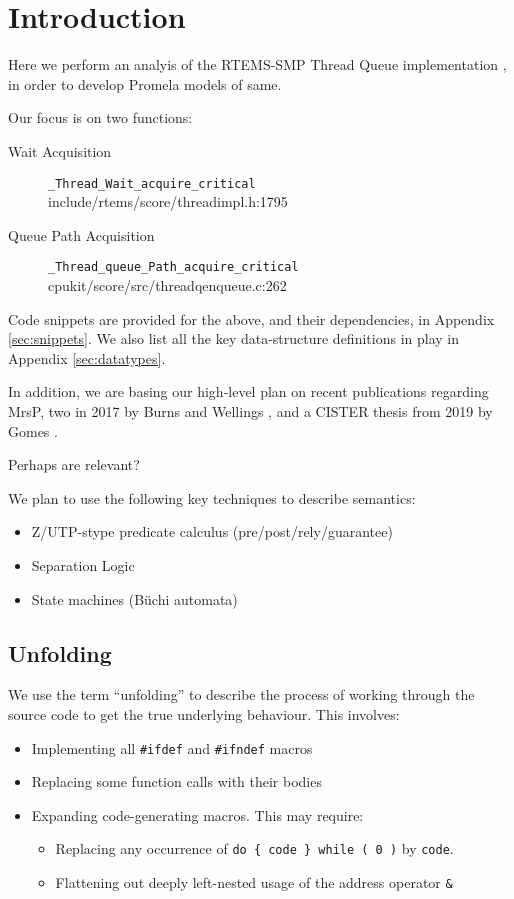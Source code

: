 \section{Introduction}

Here we perform an analyis of the RTEMS-SMP Thread Queue implementation
\cite{Burns:2013:MrsP,Catellani:2015:MrsP},
in order to develop Promela models of same.

Our focus is on two functions:
\begin{description}
  \item [Wait Acquisition] \verb"_Thread_Wait_acquire_critical"
    \\ include/rtems/score/threadimpl.h:1795
  \item [Queue Path Acquisition] \verb"_Thread_queue_Path_acquire_critical"
    \\ cpukit/score/src/threadqenqueue.c:262
\end{description}

Code snippets are provided for the above,
and their dependencies,
in Appendix \ref{sec:snippets}.
We also list all the key data-structure definitions in play
in Appendix \ref{sec:datatypes}.

In addition,
we are basing our high-level plan on recent publications regarding MrsP,
two in 2017 by Burns and Wellings
\cite{Zhao:2017:MrsP,Garrido:2017:MrsP},
and a CISTER thesis from 2019 by Gomes
\cite{Gomes:2019:MrsP}.

Perhaps \cite{Zhao:2020:MrsP,Zhao:2021:MrsP}
are relevant?


We plan to use the following key techniques to describe semantics:
\begin{itemize}
  \item Z/UTP-stype predicate calculus (pre/post/rely/guarantee)
  \item Separation Logic
  \item State machines (B\"{u}chi automata)
\end{itemize}

\subsection{Unfolding}

We use the term ``unfolding'' to describe the process of working through
the source code to get the true underlying behaviour.
This involves:
\begin{itemize}
  \item
    Implementing all \verb"#ifdef" and \verb"#ifndef" macros
  \item
    Replacing some function calls with their bodies
  \item
    Expanding code-generating macros.
    This may require:
    \begin{itemize}
      \item
        Replacing any occurrence of \verb"do { code } while ( 0 )"
        by \verb"code".
     \item
       Flattening out deeply left-nested usage of the address operator \verb"&"
    \end{itemize}
\end{itemize}

